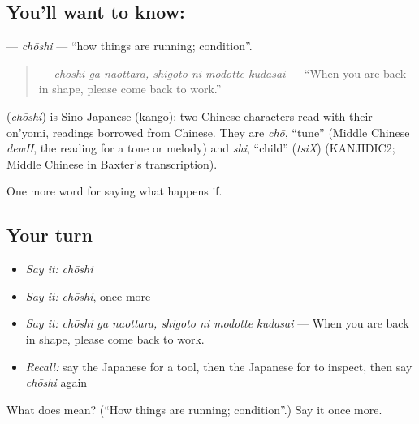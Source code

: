 \subsection*{You'll want to know: }
\textbf{} — \emph{chōshi} — \textquotedblleft{}how things are running; condition\textquotedblright{}.

\begin{quote}
\textbf{   } — \emph{chōshi ga naottara, shigoto ni modotte kudasai} — \textquotedblleft{}When you are back in shape, please come back to work.\textquotedblright{}
\end{quote}

\begin{cousinweb}
\textbf{} (\emph{chōshi}) is Sino-Japanese (kango): two Chinese characters read with their on'yomi, readings borrowed from Chinese. They are \emph{chō}, \textquotedblleft{}tune\textquotedblright{} (Middle Chinese \emph{dewH}, the reading for a tone or melody) and \emph{shi}, \textquotedblleft{}child\textquotedblright{} (\emph{tsiX}) (KANJIDIC2; Middle Chinese in Baxter's transcription).
\end{cousinweb}

\begin{grammarlens}[title={What you've built}]
One more word for saying what happens if.
\end{grammarlens}

\subsection*{Your turn}
\begin{itemize}
\raggedright
  \item \emph{Say it:} \emph{chōshi}
  \item \emph{Say it:} \emph{chōshi}, once more
  \item \emph{Say it:} \emph{chōshi ga naottara, shigoto ni modotte kudasai} — When you are back in shape, please come back to work.
  \item \emph{Recall:} say the Japanese for a tool, then the Japanese for to inspect, then say \emph{chōshi} again
\end{itemize}

\begin{tcolorbox}[breakable,colback=teal!4,colframe=teal!35!black,title={Before you move on}]
What does  mean? (\textquotedblleft{}How things are running; condition\textquotedblright{}.) Say it once more.
\end{tcolorbox}
